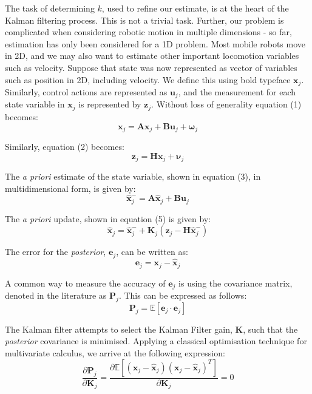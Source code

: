 \documentclass[a4paper]{article}
\begin{document}
The task of determining $k$, used to refine our estimate, is at the heart of the Kalman filtering process. This is not a trivial task. Further, our problem is complicated when considering robotic motion in multiple dimensions - so far, estimation has only been considered for a 1D problem. Most mobile robots move in 2D, and we may also want to estimate other important locomotion variables such as velocity. Suppose that state was now represented as vector of variables such as position in 2D, including velocity. We define this using bold typeface $\mathbf{x}_j$. Similarly, control actions are represented as $\mathbf{u}_j$, and the measurement for each state variable in $\mathbf{x}_j$ is represented by $\mathbf{z}_j$. Without loss of generality equation (1) becomes:
\begin{equation}
\mathbf{x}_j = \mathbf{A} \mathbf{x}_j + \mathbf{B} \mathbf{u}_j + \boldsymbol{\omega}_j
\end{equation}

Similarly, equation (2) becomes:
\begin{equation}
\mathbf{z}_j = \mathbf{H} \mathbf{x}_j + \boldsymbol{\nu}_j
\end{equation}

The \textit{a priori} estimate of the state variable, shown in equation (3), in multidimensional form, is given by:
\begin{equation}
\hat{\mathbf{x}}^-_j = \mathbf{A} \hat{\mathbf{x}}_j + \mathbf{B} \mathbf{u}_j
\end{equation}

The \textit{a priori} update, shown in equation (5) is given by:
\begin{equation}
\hat{\mathbf{x}}_j = \hat{\mathbf{x}}^-_j + \mathbf{K}_j (\mathbf{z}_j - \mathbf{H} \hat{\mathbf{x}}^-_j)
\end{equation}

The error for the \textit{posterior}, $\mathbf{e}_j$, can be written as:
\begin{equation}
\mathbf{e}_j = \mathbf{x}_j - \hat{\mathbf{x}}_j
\end{equation}

A common way to measure the accuracy of $\mathbf{e}_j$ is using the covariance matrix, denoted in the literature as $\mathbf{P}_j$. This can be expressed as follows:
\begin{equation}
\mathbf{P}_j = \mathbb{E}[\mathbf{e}_j \cdot \mathbf{e}_j]
\end{equation}

The Kalman filter attempts to select the Kalman Filter gain, $\mathbf{K}$, such that the \textit{posterior} covariance is minimised. Applying a classical optimisation technique for multivariate calculus, we arrive at the following expression:
\begin{equation}
\frac{\partial \mathbf{P}_j}{\partial \mathbf{K}_j} = \frac{\partial \mathbb{E}[(\mathbf{x}_j - \hat{\mathbf{x}}_j)(\mathbf{x}_j - \hat{\mathbf{x}}_j)^T]}{\partial \mathbf{K}_j} = 0
\end{equation}
\end{document}
